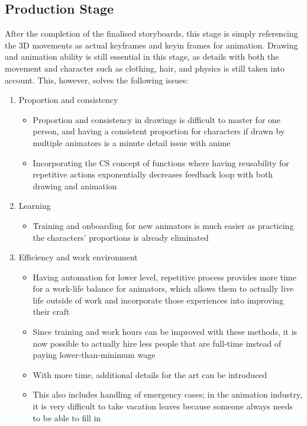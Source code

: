 \subsection{Production Stage}

After the completion of the finalised storyboards, this stage is simply referencing the 3D movements as actual keyframes and keyin frames for animation. Drawing and animation ability is still essential in this stage, as details with both the movement and character such as clothing, hair, and physics is still taken into account. This, however, solves the following issues:
\begin{enumerate}
    \item Proportion and consistency
        \begin{itemize}
            \item Proportion and consistency in drawings is difficult to master for one person, and having a consistent proportion for characters if drawn by multiple animators is a minute detail issue with anime~\cite{dragonballInconsistency}
            \item Incorporating the CS concept of functions where having reusability for repetitive actions exponentially decreases feedback loop with both drawing and animation
        \end{itemize}
    \item Learning
        \begin{itemize}
            \item Training and onboarding for new animators is much easier as practicing the characters' proportions is already eliminated
        \end{itemize}
    \item Efficiency and work environment
        \begin{itemize}
            \item Having automation for lower level, repetitive process provides more time for a work-life balance for animators, which allows them to actually live life outside of work and incorporate those experiences into improving their craft
            \item Since training and work hours can be improved with these methods, it is now possible to actually hire less people that are full-time instead of paying lower-than-minimum wage~\cite{animatorPayLessThanMcdonalds}
            \item With more time, additional details for the art can be introduced
            \item This also includes handling of emergency cases; in the animation industry, it is very difficult to take vacation leaves because someone always needs to be able to fill in\cite{starDisneyAnimator}
        \end{itemize}
\end{enumerate}

